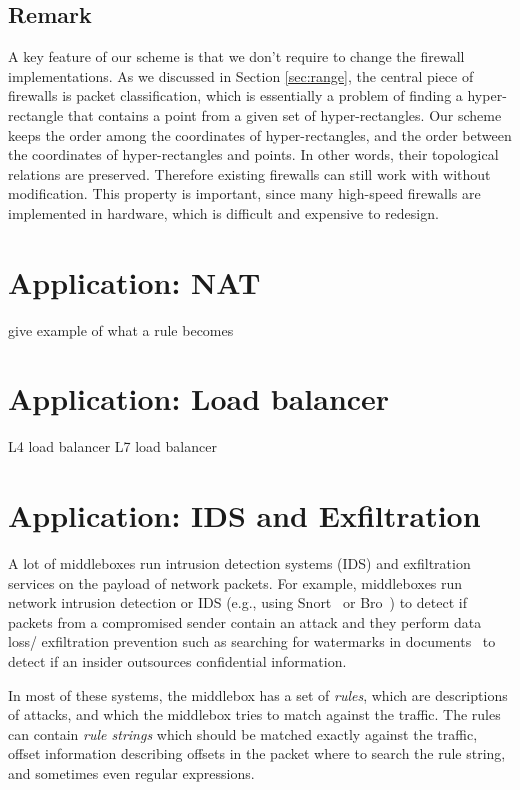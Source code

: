 \subsection{Remark}
A key feature of our scheme is that we don't require to change the firewall implementations. As we discussed in Section \ref{sec:range}, the central 
piece of firewalls is packet classification, which is essentially a problem of finding a hyper-rectangle that contains a point from a given set of hyper-rectangles. Our \RM scheme keeps the order among the coordinates of hyper-rectangles, and the order between the coordinates of hyper-rectangles and points. In other words, their topological relations are preserved. Therefore existing firewalls can still work with \sys without modification. This property is important, since many high-speed firewalls are implemented in hardware, which is difficult and expensive to redesign.

\section{Application: NAT}\label{sec:nat}

give example of what a rule becomes

\section{Application: Load balancer}\label{sec:loadb}

L4 load balancer
L7 load balancer

\section{Application: IDS and Exfiltration}\label{sec:IDS}


A lot of middleboxes run intrusion detection systems (IDS) and exfiltration services on the payload of network packets.
For example, middleboxes run network intrusion detection or IDS (e.g., using  Snort~\cite{Snort} 
or Bro~\cite{Bro}) to detect if packets from a compromised sender contain an attack and they 
perform data loss/ exfiltration prevention such as searching for watermarks in 
documents~\cite{CMU_exfiltration_report} to detect if an insider outsources confidential information.

In most of these systems, the middlebox has a set of {\em rules}, which are descriptions of attacks, and which 
the middlebox tries to match against the traffic. The rules can contain {\em rule strings} which should be matched
exactly against the traffic, offset information describing offsets in the packet where to search the rule string, and
sometimes even regular expressions.

